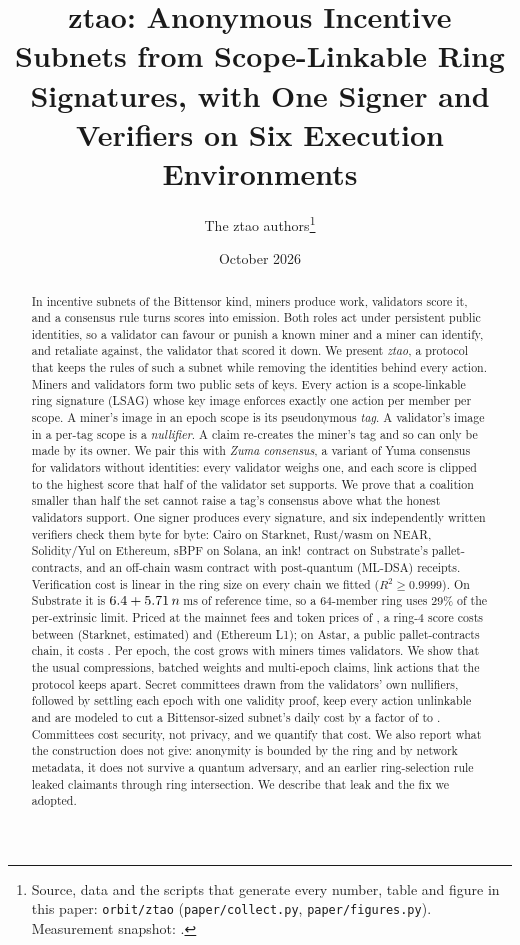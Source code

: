 \documentclass[11pt]{article}
\title{\textbf{ztao: Anonymous Incentive Subnets from Scope-Linkable Ring Signatures, with One Signer and Verifiers on Six Execution Environments}}
\author{The ztao authors\thanks{Source, data and the scripts that generate every number, table and figure in this paper: \texttt{orbit/ztao} (\texttt{paper/collect.py}, \texttt{paper/figures.py}). Measurement snapshot: \snapdate.}}
\date{October 2026}
\theoremstyle{remark}
\begin{document}
\maketitle

\begin{abstract}
In incentive subnets of the Bittensor kind, miners produce work, validators score it, and a consensus rule turns scores into emission. Both roles act under persistent public identities, so a validator can favour or punish a known miner and a miner can identify, and retaliate against, the validator that scored it down. We present \emph{ztao}, a protocol that keeps the rules of such a subnet while removing the identities behind every action. Miners and validators form two public sets of keys. Every action is a scope-linkable ring signature (LSAG) whose key image enforces exactly one action per member per scope. A miner's image in an epoch scope is its pseudonymous \emph{tag}. A validator's image in a per-tag scope is a \emph{nullifier}. A claim re-creates the miner's tag and so can only be made by its owner. We pair this with \emph{Zuma consensus}, a variant of Yuma consensus for validators without identities: every validator weighs one, and each score is clipped to the highest score that half of the validator set supports. We prove that a coalition smaller than half the set cannot raise a tag's consensus above what the honest validators support. One signer produces every signature, and six independently written verifiers check them byte for byte: Cairo on Starknet, Rust/wasm on NEAR, Solidity/Yul on Ethereum, sBPF on Solana, an ink!\ contract on Substrate's pallet-contracts, and an off-chain wasm contract with post-quantum (ML-DSA) receipts. Verification cost is linear in the ring size on every chain we fitted ($R^2 \ge 0.9999$). On Substrate it is $6.4 + 5.71\,n$\,ms of reference time, so a 64-member ring uses 29\% of the per-extrinsic limit. Priced at the mainnet fees and token prices of \snapdate, a ring-4 score costs between \usdSn{} (Starknet, estimated) and \usdEth{} (Ethereum L1); on Astar, a public pallet-contracts chain, it costs \usdSub. Per epoch, the cost grows with miners times validators. We show that the usual compressions, batched weights and multi-epoch claims, link actions that the protocol keeps apart. Secret committees drawn from the validators' own nullifiers, followed by settling each epoch with one validity proof, keep every action unlinkable and are modeled to cut a Bittensor-sized subnet's daily cost by a factor of \scaleMinRatio{} to \scaleMaxRatio{}. Committees cost security, not privacy, and we quantify that cost. We also report what the construction does not give: anonymity is bounded by the ring and by network metadata, it does not survive a quantum adversary, and an earlier ring-selection rule leaked claimants through ring intersection. We describe that leak and the fix we adopted.
\end{abstract}
\end{document}
